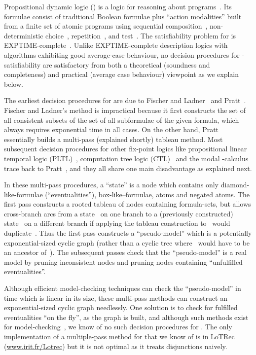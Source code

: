 \documentclass{entcs}
\newcommand{\pdl}{}
\begin{document}
Propositional dynamic logic (\pdl{}) is a logic
for reasoning about programs~\cite{pratt-semantical,fischer-ladner-dynamic}.
Its formulae consist of traditional Boolean formulae
plus ``action modalities'' built from a finite set of atomic programs
using sequential composition~, non-deterministic choice~,
repetition~, and test~.
The satisfiability problem for \pdl{}
is EXPTIME-complete~\cite{pratt-near-optimal-reasoning-about-action}.
Unlike EXPTIME-complete description logics
with algorithms exhibiting good average-case behaviour,
no decision procedures for \pdl{}-satisfiability are satisfactory
from both a theoretical (soundness and completeness)
and practical (average case behaviour) viewpoint as we explain below.

The earliest decision procedures for \pdl{}
are due to Fischer and Ladner~\cite{fischer-ladner-dynamic}
and Pratt~\cite{pratt-near-optimal-reasoning-about-action}.
Fischer and Ladner's method is impractical
because it first constructs 
the set of all consistent subsets of the set of all subformulae of the given formula,
which always requires exponential time in all cases.
On the other hand, Pratt~\cite{pratt-near-optimal-reasoning-about-action}
essentially builds a multi-pass (explained shortly) tableau method.
Most subsequent decision procedures for other fix-point logics
like propositional linear temporal logic (PLTL)~\cite{wolper-expressive},
computation tree logic (CTL)~\cite{ben-ari-pnueli-manna-branching,emerson-halpern-decision}
and the modal -calculus~\cite{kozen-parikh}
trace back to Pratt~\cite{pratt-near-optimal-reasoning-about-action},
and they all share one main disadvantage as explained next.

In these multi-pass procedures,
a ``state'' is a node
which contains only diamond-like-formulae (``eventualities''),
box-like--formulae, atoms and negated atoms.
The first pass constructs a rooted tableau of nodes containing formula-sets,
but allows cross-branch arcs from a state~ on one branch
to a (previously constructed) state~ on a different branch
if applying the tableau construction to~ would duplicate~.
Thus the first pass constructs a ``pseudo-model''
which is a potentially exponential-sized cyclic graph
(rather than a cyclic tree where~ would have to be an ancestor of~).
The subsequent passes check that the ``pseudo-model'' is a real model
by pruning inconsistent nodes and pruning nodes containing ``unfulfilled eventualities''.

Although efficient model-checking techniques
can check the ``pseudo-model'' in time which is linear in its size,
these multi-pass methods can construct an exponential-sized cyclic graph needlessly.
One solution is to check for fulfilled eventualities ``on the fly'',
as the graph is built,
and although such methods exist for
model-checking~\cite{cleaveland,bhat-cleaveland-on-the-fly-model-checking},
we know of no such decision procedures for \pdl{}. 
The only implementation of a multiple-pass method for \pdl{}
that we know of is in LoTRec (\url{www.irit.fr/Lotrec})
but it is not optimal as it treats disjunctions naively.
\end{document}
